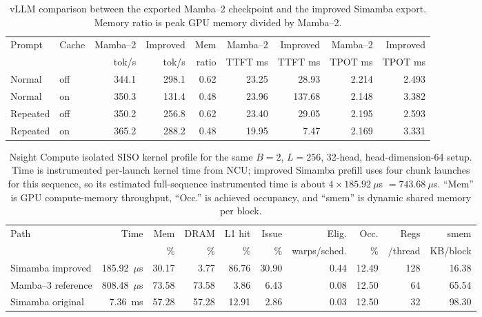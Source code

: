 \documentclass[conference]{IEEEtran}
\newcommand{\modelname}{Simamba\xspace}
\newcommand{\mambatwo}{Mamba--2\xspace}
\newcommand{\mambathree}{Mamba--3\xspace}
\begin{document}
\begin{table}[t]
\caption{vLLM comparison between the exported \mambatwo checkpoint and the improved \modelname export. Memory ratio is peak GPU memory divided by \mambatwo.}
\label{tab:vllm_comparison}
\centering
\footnotesize
\begin{tabular}{@{}llrrrrrrr@{}}
\toprule
Prompt & Cache & \mambatwo & Improved & Mem & \mambatwo & Improved & \mambatwo & Improved\\
 &  & tok/s & tok/s & ratio & TTFT ms & TTFT ms & TPOT ms & TPOT ms\\
\midrule
Normal & off & 344.1 & 298.1 & 0.62 & 23.25 & 28.93 & 2.214 & 2.493\\
Normal & on & 350.3 & 131.4 & 0.48 & 23.96 & 137.68 & 2.148 & 3.382\\
Repeated & off & 350.2 & 256.8 & 0.62 & 23.40 & 29.05 & 2.195 & 2.593\\
Repeated & on & 365.2 & 288.2 & 0.48 & 19.95 & 7.47 & 2.169 & 3.331\\
\bottomrule
\end{tabular}
\end{table}

\begin{table}[t]
\caption{Nsight Compute isolated SISO kernel profile for the same $B=2$, $L=256$, 32-head, head-dimension-64 setup. Time is instrumented per-launch kernel time from NCU; improved \modelname prefill uses four chunk launches for this sequence, so its estimated full-sequence instrumented time is about $4\times185.92~\mu$s $=743.68~\mu$s. ``Mem'' is GPU compute-memory throughput, ``Occ.'' is achieved occupancy, and ``smem'' is dynamic shared memory per block.}
\label{tab:app_ncu_kernel_profile}
\centering
\scriptsize
\begin{tabular}{@{}lrrrrrrrrr@{}}
\toprule
Path & Time & Mem & DRAM & L1 hit & Issue & Elig. & Occ. & Regs & smem\\
 &  & \% & \% & \% & \% & warps/sched. & \% & /thread & KB/block\\
\midrule
\modelname{} improved & 185.92~$\mu$s & 30.17 & 3.77 & 86.76 & 30.90 & 0.44 & 12.49 & 128 & 16.38\\
\mambathree{} reference & 808.48~$\mu$s & 73.58 & 73.58 & 3.86 & 6.43 & 0.08 & 12.50 & 64 & 65.54\\
\modelname{} original & 7.36~ms & 57.28 & 57.28 & 12.91 & 2.86 & 0.03 & 12.50 & 32 & 98.30\\
\bottomrule
\end{tabular}
\end{table}
\end{document}

